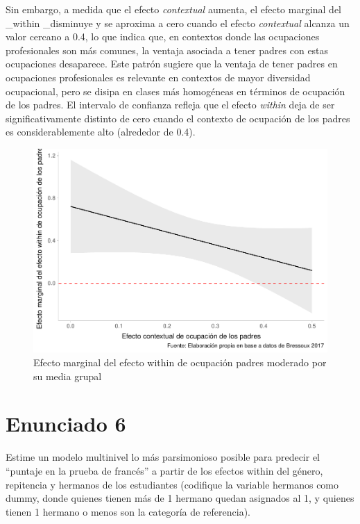 \documentclass[
  12pt,
  a4paper,
]{article}
\begin{document}
Sin embargo, a medida que el efecto \emph{contextual} aumenta, el efecto marginal del \_within \_disminuye y se aproxima a cero cuando el efecto \emph{contextual} alcanza un valor cercano a 0.4, lo que indica que, en contextos donde las ocupaciones profesionales son más comunes, la ventaja asociada a tener padres con estas ocupaciones desaparece. Este patrón sugiere que la ventaja de tener padres en ocupaciones profesionales es relevante en contextos de mayor diversidad ocupacional, pero se disipa en clases más homogéneas en términos de ocupación de los padres. El intervalo de confianza refleja que el efecto \emph{within} deja de ser significativamente distinto de cero cuando el contexto de ocupación de los padres es considerablemente alto (alrededor de 0.4).

\begin{figure}

{\centering \includegraphics[width=0.8\linewidth]{02-guia_files/figure-latex/fig1-1} 

}

\caption{Efecto marginal del efecto within de ocupación padres moderado por su media grupal}\label{fig:fig1}
\end{figure}

\hypertarget{enunciado-6}{%
\section{Enunciado 6}\label{enunciado-6}}

Estime un modelo multinivel lo más parsimonioso posible para predecir el ``puntaje en la prueba de francés'' a partir de los efectos within del género, repitencia y hermanos de los estudiantes (codifique la variable hermanos como dummy, donde quienes tienen más de 1 hermano quedan asignados al 1, y quienes tienen 1 hermano o menos son la categoría de referencia).
\end{document}
